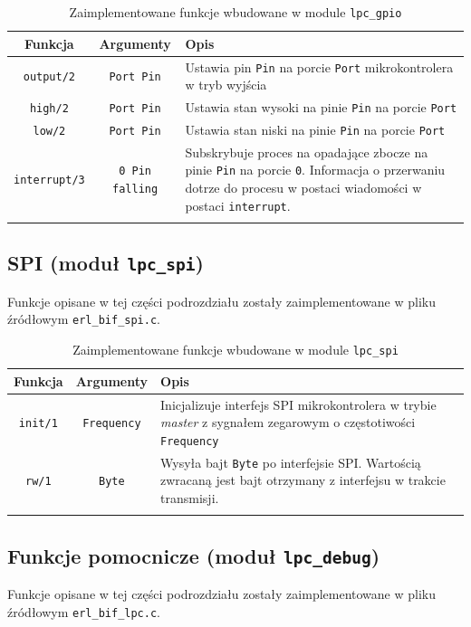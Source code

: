 \begin{longtable}{|c|c|p{10cm}|}
\hline

Funkcja & Argumenty & Opis \\
\endfirsthead
\hline
\texttt{output/2} & \texttt{Port Pin} & Ustawia pin \texttt{Pin} na porcie \texttt{Port} mikrokontrolera w tryb wyjścia\\
\hline
\texttt{high/2} & \texttt{Port Pin} & Ustawia stan wysoki na pinie \texttt{Pin} na porcie \texttt{Port} \\
\hline
\texttt{low/2} & \texttt{Port Pin} & Ustawia stan niski na pinie \texttt{Pin} na porcie \texttt{Port} \\
\hline
\texttt{interrupt/3} & \texttt{0 Pin falling} & Subskrybuje proces na opadające zbocze na pinie \texttt{Pin} na porcie \texttt{0}. Informacja  o przerwaniu dotrze do procesu w postaci wiadomości w postaci \texttt{interrupt}.\\
\hline
\caption{Zaimplementowane funkcje wbudowane w module \texttt{lpc\_gpio}} 
\label{table:bifGpio} \\
\end{longtable}


\subsection{SPI (moduł \texttt{lpc\_spi})}
\label{sub:bifSPI}

Funkcje opisane w tej części podrozdziału zostały zaimplementowane w pliku źródłowym \texttt{erl\_bif\_spi.c}.

\begin{longtable}{|c|c|p{10cm}|}
\hline

Funkcja & Argumenty & Opis \\
\endfirsthead
\hline
\texttt{init/1} & \texttt{Frequency} & Inicjalizuje interfejs SPI mikrokontrolera w trybie \emph{master} z sygnałem zegarowym o częstotiwości \texttt{Frequency} \\
\hline
\texttt{rw/1} & \texttt{Byte} & Wysyła bajt \texttt{Byte} po interfejsie SPI. Wartością zwracaną jest bajt otrzymany z interfejsu w trakcie transmisji. \\
\hline
\caption{Zaimplementowane funkcje wbudowane w module \texttt{lpc\_spi}} 
\label{table:bifSpi} \\
\end{longtable}

\subsection{Funkcje pomocnicze (moduł \texttt{lpc\_debug})}
\label{sub:bifDebug}
Funkcje opisane w tej części podrozdziału zostały zaimplementowane w pliku źródłowym \texttt{erl\_bif\_lpc.c}.

